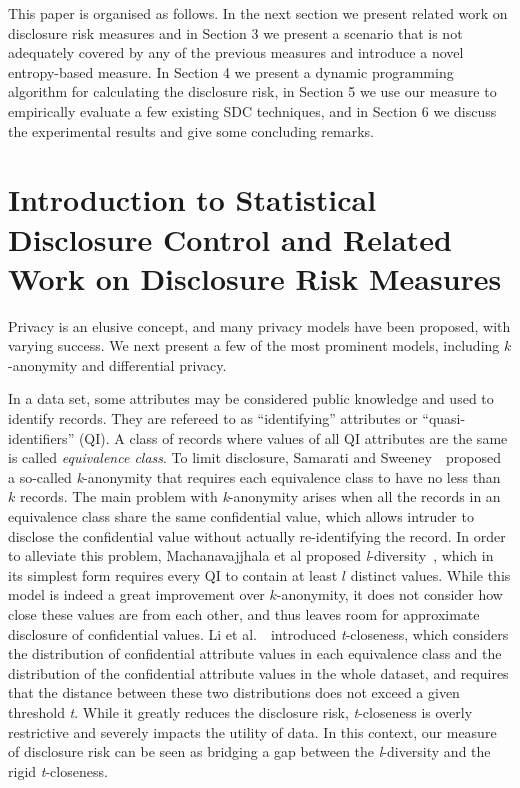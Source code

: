 \documentclass{llncs}
\begin{document}
This paper is organised as follows. In the next section we present
related work on disclosure risk measures and in Section 3 we
present a scenario that is not adequately covered by any of the
previous measures and  introduce a novel entropy-based
measure. In Section 4 we present a dynamic programming
algorithm for calculating the disclosure risk, in Section 5 we use
our measure to empirically evaluate a few existing SDC techniques, and in Section 6 we discuss
the experimental results and give some concluding remarks.

\section{Introduction to Statistical Disclosure Control and Related Work on Disclosure Risk Measures}

Privacy is an elusive concept, and many privacy models have been proposed,
with varying success. We next present a few of the most prominent models, including $k$-anonymity and differential privacy.

In a data set, some attributes may be considered public knowledge
and used to identify records. They are refereed to as
``identifying'' attributes or ``quasi-identifiers'' (QI).
A class of records where values of all QI attributes are the same is called
\emph{equivalence class}. To limit disclosure, Samarati and
Sweeney~\cite{Samarati:k-anonymity98}~proposed a so-called
\emph{k}-anonymity that requires each equivalence class to have no
less than $k$ records. The main problem with \emph{k}-anonymity arises
when all the records in an equivalence class share the same
confidential value, which allows intruder to disclose the
confidential value without actually re-identifying the record.
In order to alleviate this problem, Machanavajjhala et al proposed
 \emph{l}-diversity~\cite{MKGV07}, which in its simplest form  requires every QI to contain at
 least $l$ distinct values. While this model is indeed a great improvement over $k$-anonymity, it does not  consider how close these values are from each other,
 and thus leaves room for approximate disclosure of confidential values.
Li et al.~\cite{Ninghui:t-Closeness07}~introduced
\emph{t}-closeness, which considers the  distribution of
confidential attribute values in each equivalence class and the distribution of the confidential attribute values in
the whole dataset, and requires that the distance between these two distributions
does not exceed a given threshold \emph{t}. While it greatly reduces the disclosure risk, \emph{t}-closeness is overly restrictive and severely impacts the utility of data. In this context, our measure of disclosure risk can be seen as bridging a gap between the \emph{l}-diversity and the rigid \emph{t}-closeness.
\end{document}
